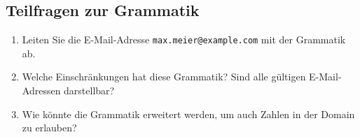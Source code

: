 \documentclass[a4paper,12pt]{article}
\begin{document}
	\subsection*{Teilfragen zur Grammatik}
	\begin{enumerate}
		\item Leiten Sie die E-Mail-Adresse \texttt{max.meier@example.com} mit der Grammatik ab.
		\item Welche Einschränkungen hat diese Grammatik? Sind alle gültigen E-Mail-Adressen darstellbar?
		\item Wie könnte die Grammatik erweitert werden, um auch Zahlen in der Domain zu erlauben?
	\end{enumerate}
	
\end{document}
